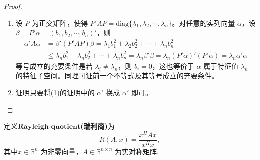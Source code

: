 \documentclass[../../main.tex]{subfiles}
\begin{document}
\begin{proof}
\begin{enumerate}[(1)]
\item 设 \(P\) 为正交矩阵，使得 \(P'AP = \mathrm{diag}\{\lambda_1,\lambda_2,\cdots,\lambda_n\}\)。对任意的实列向量 \(\alpha\)，设 \(\beta = P'\alpha = (b_1,b_2,\cdots,b_n)'\)，则
\begin{align*}
\alpha'A\alpha &= \beta'(P'AP)\beta = \lambda_1b_1^2 + \lambda_2b_2^2 + \cdots + \lambda_nb_n^2\\
&\leqslant  \lambda_nb_1^2 + \lambda_nb_2^2 + \cdots + \lambda_nb_n^2 = \lambda_n\beta'\beta = \lambda_n(P'\alpha)'(P'\alpha) = \lambda_n\alpha'\alpha
\end{align*}
等号成立的充要条件是若 \(\lambda_i \neq \lambda_n\)，则 \(b_i = 0\)，这也等价于 \(\alpha\) 属于特征值 \(\lambda_n\) 的特征子空间。同理可证前一个不等式及其等号成立的充要条件。

\item 证明只要将(1)的证明中的 \(\alpha'\) 换成 \(\overline{\alpha}'\) 即可。
\end{enumerate}
\end{proof}

\begin{definition}
定义$\mathbf{Rayleigh}\,\,\mathbf{quotient}$\textbf{(瑞利商)}为
\[
R(A, x) = \frac{x^H A x}{x^H x},
\]
其中\( x \in \mathbb{R}^n \) 为非零向量，\( A \in \mathbb{R}^{n \times n} \) 为实对称矩阵.
\end{definition}
\end{document}
